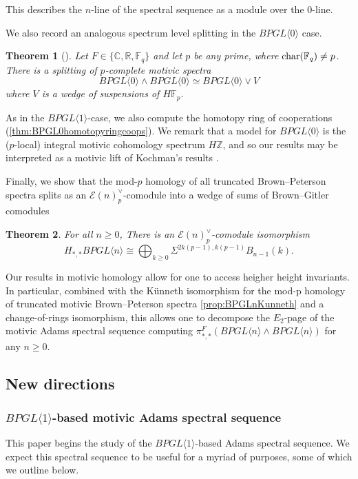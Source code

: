 \documentclass{amsart}
\newtheorem{theorem}{Theorem}[section]
\theoremstyle{plain}
\numberwithin{theorem}{section}
\numberwithin{equation}{section}
\numberwithin{figure}{section}
\newcommand{\0}{\langle 0 \rangle }
\begin{document}
This describes the $n$-line of the spectral sequence as a module over the $0$-line. %

We also record an analogous spectrum level splitting in the $BPGL\langle0\rangle$ case. 

\begin{theorem}[]
    Let $F \in \{\mathbb{C}, \mathbb{R}, \mathbb{F}_q\}$ and let $p$ be any prime, where $\textup{char}(\mathbb{F}_q) \neq p$. There is a splitting of $p$-complete motivic spectra
    \[BPGL \langle 0 \rangle \wedge BPGL \langle 0 \rangle \simeq BPGL \langle 0 \rangle \vee V\]
    where $V$ is a wedge of suspensions of $H\mathbb{F}_p$.
\end{theorem}

As in the $BPGL\langle 1 \rangle$-case, we also compute the homotopy ring of cooperations (\cref{thm:BPGL0homotopyringcoops}). We remark that a model for $BPGL\langle 0 \rangle$ is the ($p$-local) integral motivic cohomology spectrum $H\mathbb{Z}$, and so our results may be interpreted as a motivic lift of Kochman's results \cite{Kochman82}.

Finally, we show that the mod-$p$ homology of all truncated Brown--Peterson spectra splits as an $\mathcal{E}(n)^\vee_p$-comodule into a wedge of sums of Brown--Gitler comodules

\begin{theorem}
    For all $n \geq 0$, There is an $\mathcal{E}(n)^\vee_p$-comodule isomorphism
    \[H_{*,*}BPGL \langle n \rangle \cong \bigoplus_{k \geq 0}\Sigma^{2k(p-1), k(p-1)}B_{n-1}(k).\]
\end{theorem}

Our results in motivic homology allow for one to access heigher height invariants. In particular, combined with the K\"unneth isomorphism for the mod-p homology of truncated motivic Brown--Peterson spectra \cref{prop:BPGLnKunneth} and a change-of-rings isomorphism, this allows one to decompose the $E_2$-page of the motivic Adams spectral sequence computing $\pi_{*,*}^F(BPGL\langle n \rangle \wedge BPGL \langle n \rangle)$ for any $n \geq 0$.

\subsection{New directions}

\subsubsection{$BPGL\langle 1 \rangle$-based motivic Adams spectral sequence}
This paper begins the study of the $BPGL \langle 1 \rangle$-based Adams spectral sequence. We expect this spectral sequence to be useful for a myriad of purposes, some of which we outline below.
\end{document}
